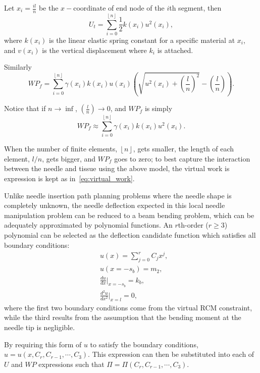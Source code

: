 Let $x_i = \frac{il}{n}$ be the $x-$coordinate of end node of the $i$th segment, then
\begin{equation}
  U_t = \sum_{i = 0}^{\left\lfloor n \right\rfloor} \frac{1}{2}k(x_i)u^2(x_i),
\end{equation}
where $k(x_i)$ is the linear elastic spring constant for a specific material at $x_i$, and $v(x_i)$ is the vertical displacement where $k_i$ is attached. 

Similarly
\begin{equation}
  WP_f = \sum_{i = 0}^{\left\lfloor n \right\rfloor} \gamma(x_i)k(x_i) u(x_i) \left( \sqrt{u^2(x_i) + \left(\frac{l}{n}\right)^2} - \left(\frac{l}{n}\right)\right).
\end{equation}

Notice that if $n \to \inf$, $\left(\frac{l}{n} \right) \to 0$, and $WP_f$ is simply
\begin{equation}
  WP_f \approx \sum_{i = 0}^{\left\lfloor n \right\rfloor} \gamma(x_i) k(x_i) u^2(x_i).
  \label{eq:virtual_work}
\end{equation}

When the number of finite elements, $\left\lfloor n\right\rfloor$, gets smaller, the length of each element, $l/n$, gets bigger, and $WP_f$ goes to zero; to best capture the interaction between the needle and tissue using the above model, the virtual work is expression is kept as in~\cref{eq:virtual_work}.

Unlike needle insertion path planning problems where the needle shape is completely unknown, the needle deflection expected in this local needle manipulation problem can be reduced to a beam bending problem, which can be adequately approximated by polynomial functions. An $r$th-order ($r \geq 3$) polynomial can be selected as the deflection candidate function which satisfies all boundary conditions:
\begin{align}
  &u(x)= \sum_{j=0}^r C_j x^j,\\
  &u(x = -s_b)= m_2, \\
  &\frac{du}{dx}\biggr\rvert_{x=-s_b}= k_b, \\
  &\frac{d^2u}{dx^2}\biggr\rvert_{x=l}= 0,
\end{align}
where the first two boundary conditions come from the virtual RCM constraint, while the third results from the assumption that the bending moment at the needle tip is negligible.

By requiring this form of $u$ to satisfy the boundary conditions, $u = u(x, C_r, C_{r-1}, \cdots, C_3)$. This expression can then be substituted into each of $U$ and $WP$ expressions such that $\Pi = \Pi(C_r, C_{r-1}, \cdots, C_3)$.

